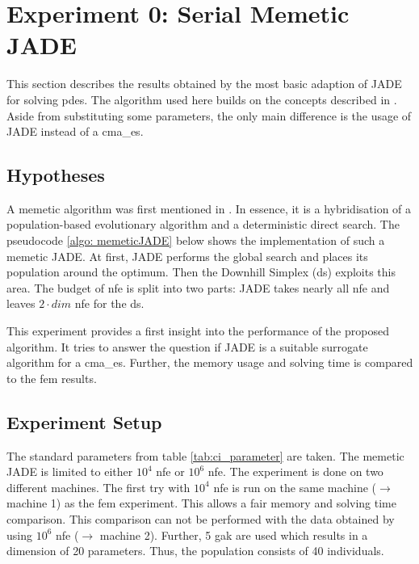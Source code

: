 \documentclass[./\jobname.tex]{subfiles}
\begin{document}
\section {Experiment 0: Serial Memetic JADE}
\label{chap:experimet_0}

This section describes the results obtained by the most basic adaption of JADE for solving \gls{pde}s. The algorithm used here builds on the concepts described in \cite{chaquet_using_2019}. Aside from substituting some parameters, the only main difference is the usage of JADE instead of a \gls{cma_es}. 

\subsection{Hypotheses}
A memetic algorithm was first mentioned in \cite{moscato_evolution_2000}. In essence, it is a hybridisation of a population-based evolutionary algorithm and a deterministic direct search. The pseudocode \ref{algo: memeticJADE} below shows the implementation of such a memetic JADE. At first, JADE performs the global search and places its population around the optimum. Then the Downhill Simplex (\gls{ds}) exploits this area. The budget of \gls{nfe} is split into two parts: JADE takes nearly all \gls{nfe} and leaves $2\cdot dim$ \gls{nfe} for the \gls{ds}.
\begin{algorithm}[h]
	\SetAlgoNoLine
	\DontPrintSemicolon
	\label{algo: memeticJADE}
\end{algorithm}
This experiment provides a first insight into the performance of the proposed algorithm. It tries to answer the question if JADE is a suitable surrogate algorithm for a \gls{cma_es}. Further, the memory usage and solving time is compared to the \gls{fem} results. 

\subsection{Experiment Setup}
The standard parameters from table \ref{tab:ci_parameter} are taken. The memetic JADE is limited to either $10^4$ \gls{nfe} or $10^6$ \gls{nfe}. The experiment is done on two different machines. The first try with $10^4$ \gls{nfe} is run on the same machine ($\rightarrow$ machine 1) as the \gls{fem} experiment. This allows a fair memory and solving time comparison. This comparison can not be performed with the data obtained by using $10^6$ \gls{nfe} ($\rightarrow$ machine 2). Further, 5 \gls{gak} are used which results in a dimension of 20 parameters. Thus, the population consists of 40 individuals. 
\end{document}
